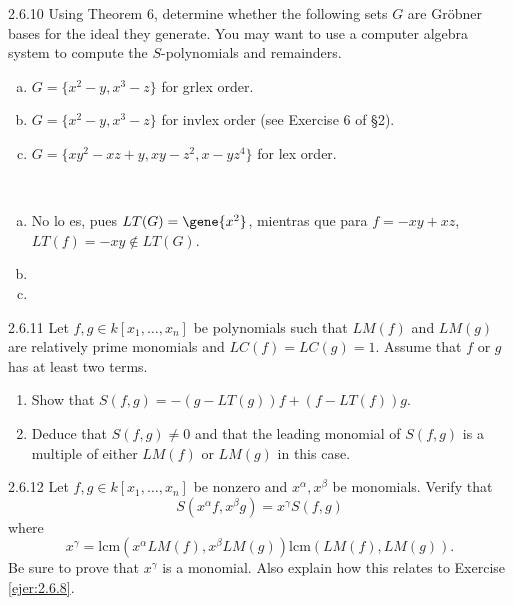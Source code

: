 \documentclass[twoside]{article}
\begin{document}
\begin{ejercicio}{2.6.10}
Using Theorem 6, determine whether the following sets $G$ are Gröbner bases for the
ideal they generate. You may want to use a computer algebra system to compute the
$S$-polynomials and remainders.
\begin{enumerate}[a.]
\item $G = \{x^2 − y, x^3 − z\}$ for grlex order.
\item $G = \{x^2 − y, x^3 − z\}$ for invlex order (see Exercise 6 of §2).
\item $G = \{xy^2 − xz + y, xy − z^2, x − yz^4\}$ for lex order.
\end{enumerate}
\end{ejercicio}
\begin{solucion}\
\begin{enumerate}[a.]
\item No lo es, pues $LT(G)=\gene{x^2}$, mientras que para $f=-xy+xz$, $LT(f)=-xy\notin LT(G)$. 
\item 
\item 
\end{enumerate}
\end{solucion}

\newpage

\begin{ejercicio}{2.6.11}
Let $f , g ∈ k[x_1,\dots , x_n]$ be polynomials such that $LM( f )$ and $LM(g)$ are relatively prime
monomials and $LC( f) = LC(g) = 1$. Assume that $f$ or $g$ has at least two terms.
\begin{enumerate}
\item Show that $S( f , g) = −(g − LT(g))f + (f − LT( f ))g$.
\item Deduce that $S( f , g) \neq 0$ and that the leading monomial of $S( f , g)$ is a multiple of
either $LM( f )$ or $LM(g)$ in this case.
\end{enumerate}
\end{ejercicio}
\begin{solucion}

\end{solucion}

\newpage

\begin{ejercicio}{2.6.12}
Let $f , g ∈ k[x_1,\dots , x_n]$ be nonzero and $x^α, x^β$ be monomials. Verify that
$$S(x^αf , x^βg) = x^γS( f , g)$$
where
$$x^γ =
\mathrm{lcm}(x^αLM( f ), x^βLM(g))
\mathrm{lcm}(LM( f ), LM(g))
.$$
Be sure to prove that $x^{γ}$ is a monomial. Also explain how this relates to Exercise \ref{ejer:2.6.8}.
\end{ejercicio}
\begin{solucion}

\end{solucion}
\end{document}
